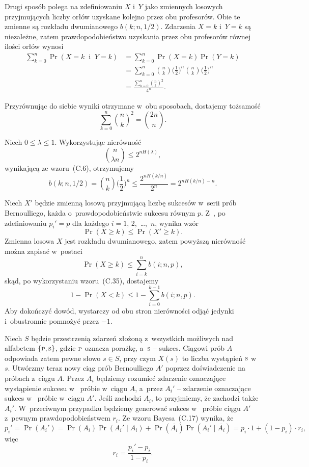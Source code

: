 Drugi sposób polega na zdefiniowaniu $X$ i~$Y$ jako zmiennych losowych przyjmujących liczby orłów uzyskane kolejno przez obu profesorów. Obie te zmienne są rozkładu dwumianowego $b(k;n,1/2)$. Zdarzenia $X=k$ i~$Y=k$ są niezależne, zatem prawdopodobieństwo uzyskania przez obu profesorów równej ilości orłów wynosi
\begin{align*}
	\sum_{k=0}^n\Pr(X=k\;\;\text{i}\;\;Y=k) &= \sum_{k=0}^n\Pr(X=k)\Pr(Y=k) \\
	&= \sum_{k=0}^n\binom{n}{k}\biggl(\frac{1}{2}\biggr)^n\binom{n}{k}\biggl(\frac{1}{2}\biggr)^n \\
	&= \frac{\sum_{k=0}^n\binom{n}{k}^2}{4^n}.
\end{align*}

Przyrównując do siebie wyniki otrzymane w~obu sposobach, dostajemy tożsamość
\[
	\sum_{k=0}^n\binom{n}{k}^2 = \binom{2n}{n}.
\]

\exercise %
Niech $0\le\lambda\le1$. Wykorzystując nierówność
\[
	\binom{n}{\lambda n} \le 2^{nH(\lambda)},
\]
wynikającą ze wzoru~(C.6), otrzymujemy
\[
	b(k;n,1/2) = \binom{n}{k}\biggl(\frac{1}{2}\biggr)^n \le \frac{2^{nH(k/n)}}{2^n} = 2^{nH(k/n)-n}.
\]

\exercise %

\noindent Niech $X'$ będzie zmienną losową przyjmującą liczbę sukcesów w~serii prób Bernoulliego, każda o~prawdopodobieństwie sukcesu równym $p$. Z~, po zdefiniowaniu $p_i'=p$ dla każdego $i=1$, 2,~\dots,~$n$, wynika wzór
\[
    \Pr(X\ge k) \le \Pr(X'\ge k).
\]
Zmienna losowa $X$ jest rozkładu dwumianowego, zatem powyższą nierówność można zapisać w~postaci
\[
    \Pr(X\ge k) \le \sum_{i=k}^nb(i;n,p),
\]
skąd, po wykorzystaniu wzoru~(C.35), dostajemy
\[
    1-\Pr(X<k) \le 1-\sum_{i=0}^{k-1}b(i;n,p).
\]
Aby dokończyć dowód, wystarczy od obu stron nierówności odjąć jedynki i~obustronnie pomnożyć przez $-1$.

\exercise %
Niech $S$ będzie przestrzenią zdarzeń złożoną z~wszystkich możliwych  nad alfabetem $\{{\scriptstyle\rm P},{\scriptstyle\rm S}\}$, gdzie ${\scriptstyle\rm P}$ oznacza porażkę, a~${\scriptstyle\rm S}$ -- sukces. Ciągowi prób $A$ odpowiada zatem pewne słowo $s\in S$, przy czym $X(s)$ to liczba wystąpień ${\scriptstyle\rm S}$ w~$s$. Utwórzmy teraz nowy ciąg prób Bernoulliego $A'$ poprzez doświadczenie na próbach z~ciągu $A$. Przez $A_i$ będziemy rozumieć zdarzenie oznaczające wystąpienie sukcesu w~ próbie w~ciągu $A$, a~przez $A_i'$ -- zdarzenie oznaczające sukces w~ próbie w~ciągu $A'$. Jeśli zachodzi $A_i$, to przyjmiemy, że zachodzi także $A_i'$. W~przeciwnym przypadku będziemy generować sukces w~ próbie ciągu $A'$ z~pewnym prawdopodobieństwem $r_i$. Ze wzoru Bayesa~(C.17) wynika, że
\[
    p_i' = \Pr(A_i') = \Pr(A_i)\Pr(A_i'\mid A_i)+\Pr(\overline{A_i})\Pr(A_i'\mid\overline{A_i}) = p_i\cdot1+(1-p_i)\cdot r_i,
\]
więc
\[
    r_i = \frac{p_i'-p_i}{1-p_i}.
\]

